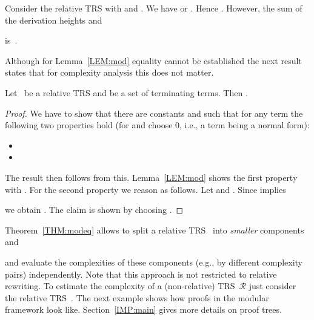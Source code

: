 \documentclass{LMCS}
\theoremstyle{plain}\newtheorem{mainthm}[thm]{Main Theorem}
\newcommand\TRS[1]{\ensuremath{\mathcal{#1}}}
\begin{document}
\begin{exa}
\label{EXPL:mod}
Consider the relative TRS  with
 and
.
We have  or
. Hence
.
However, the sum of the derivation heights
 and

is~.
\end{exa}

Although for Lemma~\ref{LEM:mod} equality cannot be established the
next result states that for complexity analysis this does not matter.

\begin{thm}
\label{THM:modeq}
Let~ be a relative TRS
and  be a set of terminating terms. Then
.
\end{thm}
\begin{proof}
We have to show that there are constants  and 
such that for any term  the following two properties hold
(for  and  choose 0, i.e., a term  being a normal form):
\begin{itemize}
\item

\item

\end{itemize}
The result then follows from this. Lemma~\ref{LEM:mod} shows the first
property with . For the second property we reason as
follows. Let  and .
Since  implies

we obtain
.
The claim is shown by choosing .
\end{proof}

Theorem~\ref{THM:modeq} allows to split a relative
TRS~
into \emph{smaller} components
 and

and evaluate the complexities of these
components (e.g., by different complexity pairs) independently. Note that
this approach is not restricted to relative rewriting. To estimate the
complexity of a (non-relative) TRS~\TRS{R} just consider the
relative TRS~. The next example shows how
proofs in the modular framework look like. Section~\ref{IMP:main} gives
more details on proof trees.
\end{document}
